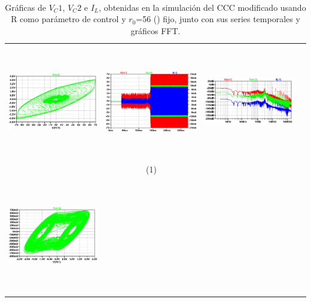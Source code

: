 \documentclass{rbf}
\begin{document}
\begin{table}[h]
    \centering
    \caption{\label{tab:r_0 fijo y variando R CCC modificado} Gráficas de $V_C1$, $V_C2$ e $I_L$, obtenidas en la simulación del CCC modificado usando R como parámetro de control y $r_0$=56 (\Omega) fijo, junto con sus series temporales y gráficos FFT.}\\
        \begin{tabular}{c c c c}
            \hline    
            \includegraphics[width=5cm,height=5cm]{R7/1303 C 220 attractor.png}&
            \includegraphics[width=5cm,height=5cm]{R7/1303 C 220 time series.png}&
            \includegraphics[width=5cm,height=5cm]{R7/1303 C 220 fft.png}&\\
            & (1) &  \\
            \includegraphics[width=5cm,height=5cm]{R7/1303 C 220 1ra EST 140ms atractor.png}&

\end{tabular}
\end{table}
\end{document}
